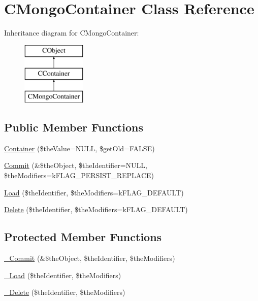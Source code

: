 \hypertarget{class_c_mongo_container}{\section{C\-Mongo\-Container Class Reference}
\label{class_c_mongo_container}
}
Inheritance diagram for C\-Mongo\-Container\-:\begin{figure}[H]
\begin{center}
\leavevmode
\includegraphics[height=3.000000cm]{class_c_mongo_container}
\end{center}
\end{figure}
\subsection*{Public Member Functions}
\begin{DoxyCompactItemize}
\item 
\hyperlink{class_c_mongo_container_a253978bb8e4d1e2613665d308de83e1e}{Container} (\$the\-Value=N\-U\-L\-L, \$get\-Old=F\-A\-L\-S\-E)
\item 
\hyperlink{class_c_mongo_container_af3c9d45943750bd07e3779a44e8945d9}{Commit} (\&\$the\-Object, \$the\-Identifier=N\-U\-L\-L, \$the\-Modifiers=k\-F\-L\-A\-G\-\_\-\-P\-E\-R\-S\-I\-S\-T\-\_\-\-R\-E\-P\-L\-A\-C\-E)
\item 
\hyperlink{class_c_mongo_container_a6153cbe560c1e073279f0d5ef14ce81d}{Load} (\$the\-Identifier, \$the\-Modifiers=k\-F\-L\-A\-G\-\_\-\-D\-E\-F\-A\-U\-L\-T)
\item 
\hyperlink{class_c_mongo_container_adc8d0f00f2caabb42a91e9b34807e548}{Delete} (\$the\-Identifier, \$the\-Modifiers=k\-F\-L\-A\-G\-\_\-\-D\-E\-F\-A\-U\-L\-T)
\end{DoxyCompactItemize}
\subsection*{Protected Member Functions}
\begin{DoxyCompactItemize}
\item 
\hyperlink{class_c_mongo_container_aa694837ffb5e9a4483a7dfa5bfa6e45c}{\-\_\-\-Commit} (\&\$the\-Object, \$the\-Identifier, \$the\-Modifiers)
\item 
\hyperlink{class_c_mongo_container_a828ff942e1c3ebaa2d9bbd635ec84d4d}{\-\_\-\-Load} (\$the\-Identifier, \$the\-Modifiers)
\item 
\hyperlink{class_c_mongo_container_ae93f463eedf14e8969ecfbb28365e42f}{\-\_\-\-Delete} (\$the\-Identifier, \$the\-Modifiers)
\end{DoxyCompactItemize}


